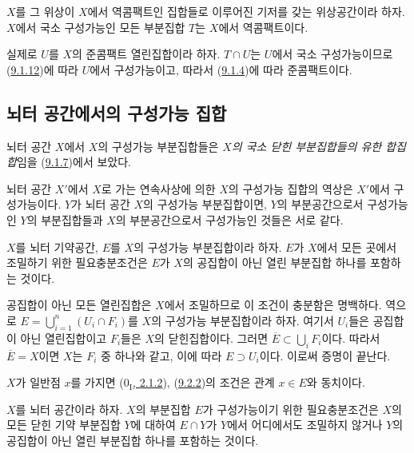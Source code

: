 \begin{corollary}[9.1.13]
\label{0.9.1.13-ko}
$X$를 그 위상이 $X$에서 역콤팩트인 집합들로 이루어진 기저를 갖는
위상공간이라 하자. $X$에서 국소 구성가능인 모든 부분집합 $T$는
$X$에서 역콤팩트이다.
\end{corollary}

실제로 $U$를 $X$의 준콤팩트 열린집합이라 하자. $T\cap U$는 $U$에서
국소 구성가능이므로 (\hyperref[0.9.1.12-ko]{9.1.12})에 따라 $U$에서
구성가능이고, 따라서 (\hyperref[0.9.1.4-ko]{9.1.4})에 따라
준콤팩트이다.

\subsection{뇌터 공간에서의 구성가능 집합}
\label{subsection:0.9.2-ko}

\begin{env}[9.2.1]
\label{0.9.2.1-ko}
뇌터 공간 $X$에서 $X$의 구성가능 부분집합들은 \emph{$X$의 국소 닫힌
부분집합들의 유한 합집합}임을
(\hyperref[0.9.1.7-ko]{9.1.7})에서 보았다.

뇌터 공간 $X'$에서 $X$로 가는 연속사상에 의한 $X$의 구성가능 집합의
역상은 $X'$에서 구성가능이다. $Y$가 뇌터 공간 $X$의 구성가능
부분집합이면, $Y$의 부분공간으로서 구성가능인 $Y$의 부분집합들과
$X$의 부분공간으로서 구성가능인 것들은 서로 같다.
\end{env}

\begin{proposition}[9.2.2]
\label{0.9.2.2-ko}
$X$를 뇌터 기약공간, $E$를 $X$의 구성가능 부분집합이라 하자. $E$가
$X$에서 모든 곳에서 조밀하기 위한 필요충분조건은 $E$가 $X$의 공집합이
아닌 열린 부분집합 하나를 포함하는 것이다.
\end{proposition}

공집합이 아닌 모든 열린집합은 $X$에서 조밀하므로 이 조건이 충분함은
명백하다. 역으로 $E=\bigcup_{i=1}^n(U_i\cap F_i)$를 $X$의 구성가능
부분집합이라 하자. 여기서 $U_i$들은 공집합이 아닌 열린집합이고
$F_i$들은 $X$의 닫힌집합이다. 그러면
$\overline{E}\subset\bigcup_i F_i$이다. 따라서 $\overline{E}=X$이면
$X$는 $F_i$ 중 하나와 같고, 이에 따라 $E\supset U_i$이다. 이로써
증명이 끝난다.

$X$가 일반점 $x$를 가지면
(\hyperref[0.2.1.2-ko]{$0_{\mathrm I}$, 2.1.2}),
(\hyperref[0.9.2.2-ko]{9.2.2})의 조건은 관계 $x\in E$와 동치이다.

\begin{proposition}[9.2.3]
\label{0.9.2.3-ko}
$X$를 뇌터 공간이라 하자. $X$의 부분집합 $E$가 구성가능이기 위한
필요충분조건은 $X$의 모든 닫힌 기약 부분집합 $Y$에 대하여 $E\cap Y$가
$Y$에서 어디에서도 조밀하지 않거나 $Y$의 공집합이 아닌 열린
부분집합 하나를 포함하는 것이다.
\end{proposition}

